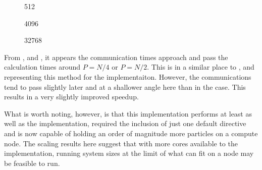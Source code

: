 %
%
\begin{figure}[!h]
    
    \caption{
        \vOneSRTimeCaption
            {\sharedandreplicateddata{}}
            {\pairoperation{}}
            {512}
    }
    \label{fig:v1_shared_and_replicated_pair_operation_512_logtime}
\end  {figure}

\begin{figure}[!h]
    
    \caption{
        \vOneSRTimeCaption{
            \sharedandreplicateddata{}}
            {\pairoperation{}}
            {4096}
    }
    \label{fig:v1_shared_and_replicated_pair_operation_4096_logtime}
\end  {figure}

\begin{figure}[!h]
    
    \caption{
        \vOneSRTimeCaption
            {\sharedandreplicateddata{}}
            {\pairoperation{}}
            {32768}
    }
    \label{fig:v1_shared_and_replicated_pair_operation_32768_logtime}
\end  {figure}

\vOneSRTimeExplanation
    {}
    {}
    {}
    {\pairoperation{}}
    {\sharedandreplicateddata{}}


%
From
,
 and
,
it appears the communication times approach and pass the calculation
times around $P = N/4$ or $P = N/2$.
%
This is in a similar place to
,
 and
representing this method for the \replicateddata{} implementaiton.
%
However, the communications tend to pass slightly later and at a shallower
angle here than in the \replicateddata{} case.
%
This results in a very slightly improved speedup.

What is worth noting, however, is that this implementation performs
at least as well as the \replicateddata{} implementation, required
the inclusion of just one default \openmp{} directive and
is now capable of holding an order of magnitude more particles on
a compute node.
%
The scaling results here suggest that with more cores available to the
implementation, running system sizes at the limit of what can fit on
a node may be feasible to run.
